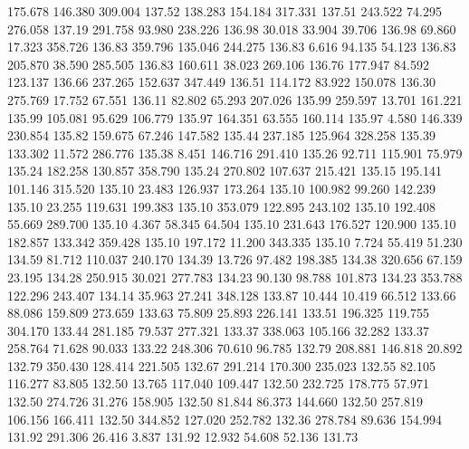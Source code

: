  175.678  146.380  309.004       137.52
 138.283  154.184  317.331       137.51
 243.522   74.295  276.058       137.19
 291.758   93.980  238.226       136.98
  30.018   33.904   39.706       136.98
  69.860   17.323  358.726       136.83
 359.796  135.046  244.275       136.83
   6.616   94.135   54.123       136.83
 205.870   38.590  285.505       136.83
 160.611   38.023  269.106       136.76
 177.947   84.592  123.137       136.66
 237.265  152.637  347.449       136.51
 114.172   83.922  150.078       136.30
 275.769   17.752   67.551       136.11
  82.802   65.293  207.026       135.99
 259.597   13.701  161.221       135.99
 105.081   95.629  106.779       135.97
 164.351   63.555  160.114       135.97
   4.580  146.339  230.854       135.82
 159.675   67.246  147.582       135.44
 237.185  125.964  328.258       135.39
 133.302   11.572  286.776       135.38
   8.451  146.716  291.410       135.26
  92.711  115.901   75.979       135.24
 182.258  130.857  358.790       135.24
 270.802  107.637  215.421       135.15
 195.141  101.146  315.520       135.10
  23.483  126.937  173.264       135.10
 100.982   99.260  142.239       135.10
  23.255  119.631  199.383       135.10
 353.079  122.895  243.102       135.10
 192.408   55.669  289.700       135.10
   4.367   58.345   64.504       135.10
 231.643  176.527  120.900       135.10
 182.857  133.342  359.428       135.10
 197.172   11.200  343.335       135.10
   7.724   55.419   51.230       134.59
  81.712  110.037  240.170       134.39
  13.726   97.482  198.385       134.38
 320.656   67.159   23.195       134.28
 250.915   30.021  277.783       134.23
  90.130   98.788  101.873       134.23
 353.788  122.296  243.407       134.14
  35.963   27.241  348.128       133.87
  10.444   10.419   66.512       133.66
  88.086  159.809  273.659       133.63
  75.809   25.893  226.141       133.51
 196.325  119.755  304.170       133.44
 281.185   79.537  277.321       133.37
 338.063  105.166   32.282       133.37
 258.764   71.628   90.033       133.22
 248.306   70.610   96.785       132.79
 208.881  146.818   20.892       132.79
 350.430  128.414  221.505       132.67
 291.214  170.300  235.023       132.55
  82.105  116.277   83.805       132.50
  13.765  117.040  109.447       132.50
 232.725  178.775   57.971       132.50
 274.726   31.276  158.905       132.50
  81.844   86.373  144.660       132.50
 257.819  106.156  166.411       132.50
 344.852  127.020  252.782       132.36
 278.784   89.636  154.994       131.92
 291.306   26.416    3.837       131.92
  12.932   54.608   52.136       131.73
